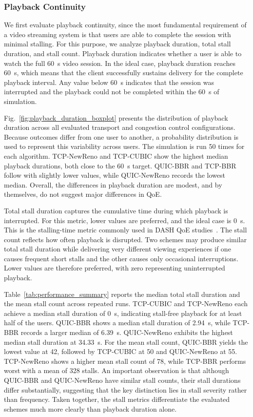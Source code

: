 \documentclass[journal]{IEEEtran}
\begin{document}
\subsubsection{Playback Continuity}
We first evaluate playback continuity, since the most fundamental requirement of a video streaming system is that users are able to complete the session with minimal stalling. For this purpose, we analyze playback duration, total stall duration, and stall count. Playback duration indicates whether a user is able to watch the full 60~s video session. In the ideal case, playback duration reaches 60~s, which means that the client successfully sustains delivery for the complete playback interval. Any value below 60~s indicates that the session was interrupted and the playback could not be completed within the 60~s of simulation.

Fig.~\ref{fig:playback_duration_boxplot} presents the distribution of playback duration across all evaluated transport and congestion control configurations. Because outcomes differ from one user to another, a probability distribution is used to represent this variability across users. The simulation is run 50 times for each algorithm.
TCP-NewReno and TCP-CUBIC show the highest median playback durations, both close to the 60~s target. QUIC-BBR and TCP-BBR follow with slightly lower values, while QUIC-NewReno records the lowest median. Overall, the differences in playback duration are modest, and by themselves, do not suggest major differences in QoE.

Total stall duration captures the cumulative time during which playback is interrupted. For this metric, lower values are preferred, and the ideal case is 0~s. This is the stalling-time metric commonly used in DASH QoE studies~\cite{Fang2024,Zhao2024}. The stall count reflects how often playback is disrupted. Two schemes may produce similar total stall duration while delivering very different viewing experiences if one causes frequent short stalls and the other causes only occasional interruptions. Lower values are therefore preferred, with zero representing uninterrupted playback.

Table~\ref{tab:performance_summary} reports the median total stall duration and the mean stall count across repeated runs. TCP-CUBIC and TCP-NewReno each achieve a median stall duration of 0~s, indicating stall-free playback for at least half of the users. QUIC-BBR shows a median stall duration of 2.94~s, while TCP-BBR records a larger median of 6.39~s. QUIC-NewReno exhibits the highest median stall duration at 34.33~s. For the mean stall count, QUIC-BBR yields the lowest value at 42, followed by TCP-CUBIC at 50 and QUIC-NewReno at 55. TCP-NewReno shows a higher mean stall count of 78, while TCP-BBR performs worst with a mean of 328 stalls. An important observation is that although QUIC-BBR and QUIC-NewReno have similar stall counts, their stall durations differ substantially, suggesting that the key distinction lies in stall severity rather than frequency. Taken together, the stall metrics differentiate the evaluated schemes much more clearly than playback duration alone.
\end{document}
